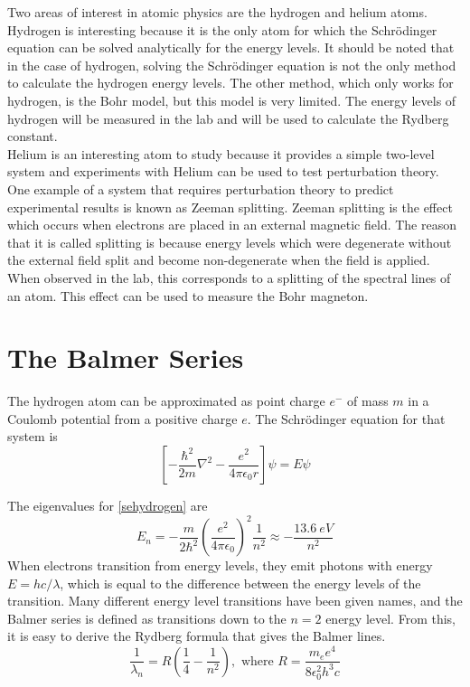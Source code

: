 \documentclass[11pt,letterpaper]{article}
\begin{document}
Two areas of interest in atomic physics are the hydrogen and helium atoms.
Hydrogen is interesting because it is the only atom for which the
Schr\"{o}dinger equation can be solved analytically for the energy levels. It
should be noted that in the case of hydrogen, solving the  Schr\"{o}dinger
equation is not the only method to calculate the hydrogen energy levels. The
other method, which only works for hydrogen, is the Bohr model, but this model
is very limited. The energy levels of hydrogen will be measured in the lab and
will be used to calculate the Rydberg constant.\\

Helium is an interesting atom to study because it provides a simple two-level
system and experiments with Helium can be used to test perturbation theory. One
example of a system that requires perturbation theory to predict experimental
results is known as Zeeman splitting. Zeeman splitting is the effect which
occurs when electrons are placed in an external magnetic field. The reason that
it is called splitting is because energy levels which were degenerate without
the external field split and become non-degenerate when the field is applied.
When observed in the lab, this corresponds to a splitting of the spectral lines
of an atom. This effect can be used to measure the Bohr magneton.

\section{The Balmer Series}

The hydrogen atom can be approximated as point charge $e^-$ of mass $m$ in a
Coulomb potential from a positive charge $e$. The Schr\"{o}dinger equation for
that system is \cite{BransdenQM}
\begin{equation}
    \left[-\frac{\hbar^2}{2m}\nabla^2 - \frac{e^2}{4\pi \epsilon_0 r}\right]
        \psi = E\psi
    \label{sehydrogen}
\end{equation}

The eigenvalues for \eqref{sehydrogen} are \cite{BransdenQM}
\begin{equation}
    E_n = -\frac{m}{2\hbar^2}
        \left(\frac{e^2}{4\pi \epsilon_0}\right)^2
        \frac{1}{n^2}
        \approx -\frac{13.6\ eV}{n^2}
\end{equation}
When electrons transition from energy levels, they emit photons with energy 
$E = hc / \lambda$, which is equal to the difference between the energy levels
of the transition. Many different energy level transitions have been given
names, and the Balmer series is defined as transitions down to the $n = 2$
energy level. From this, it is easy to derive the Rydberg formula that gives the
Balmer lines.
\begin{equation}
    \frac{1}{\lambda_n} = R \left(\frac{1}{4} - \frac{1}{n^2}\right),
    \text{ where } R = \frac{m_e e^4}{8 \epsilon_0^2 h^3 c}
    \label{rydberg}
\end{equation}
\end{document}
